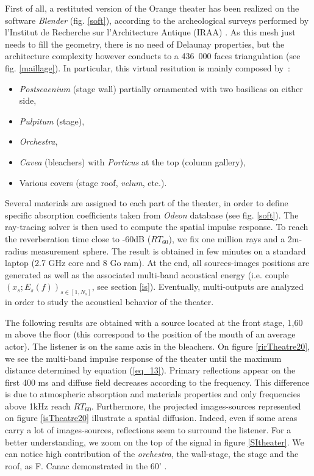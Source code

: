 \documentclass{aes2e}
\begin{document}
First of all, a restituted version of the Orange theater has been realized on the software \textit{Blender} (fig. \ref{soft}), according to the archeological surveys performed by l'Institut de Recherche sur l'Architecture Antique (IRAA) \cite{orangeTxt}. As this mesh just needs to fill the geometry, there is no need of Delaunay properties, but the architecture complexity however conducts to a 436~000 faces triangulation (see fig. \ref{maillage}). In particular, this virtual resitution is mainly composed by~:
\begin{itemize}
 \item \textit{Postscaenium} (stage wall) partially ornamented with two basilicas on either side,
 \item \textit{Pulpitum} (stage),
 \item \textit{Orchestra},
 \item \textit{Cavea} (bleachers) with \textit{Porticus} at the top (column gallery),
  \item Various covers (stage roof, \textit{velum}, etc.).
\end{itemize}
Several materials are assigned to each part of the theater, in order to define specific absorption coefficients taken from \textit{Odeon} database \cite{odeon} (see fig. \ref{soft}). The ray-tracing solver is then used to compute the spatial impulse response. To reach the reverberation time close to -60dB ($RT_{60}$), we fix one million rays and a 2m-radius measurement sphere. The result is obtained in few minutes on a standard laptop (2.7 GHz core and 8 Go ram). At the end, all sources-images positions are generated as well as the associated multi-band acoustical energy (i.e. couple $(x_s;E_s(f))_{s \in [1, N_s]}$, see section \ref{is}). Eventually, multi-outputs are analyzed in order to study the acoustical behavior of the theater.

The following results are obtained with a source located at the front stage, 1,60 m above the floor (this correspond to the position of the mouth of an average actor). The listener is on the same axis in the bleachers. On figure \ref{rirTheatre20}, we see the multi-band impulse response of the theater until the maximum distance determined by equation (\ref{eq_13}). Primary reflections appear on the first 400 ms and diffuse field decreases according to the frequency. This difference is due to atmospheric absorption and materials properties and only frequencies above 1kHz reach $RT_{60}$. Furthermore, the projected images-sources represented on figure \ref{isTheatre20} illustrate a spatial diffusion. Indeed, even if some areas carry a lot of images-sources, reflections seem to surround the listener. For a better understanding, we zoom on the top of the signal in figure \ref{SItheater}. We can notice high contribution of the \textit{orchestra}, the wall-stage, the stage and the roof, as F. Canac demonstrated in the 60' \cite{canac}. 
\end{document}
